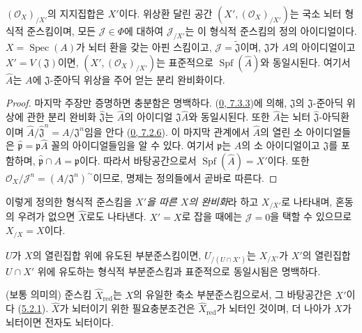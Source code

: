 \begin{proposition}[10.8.5]
\label{I.10.8.5-ko}
$(\mathscr{O}_X)_{/X'}$의 지지집합은 $X'$이다. 위상환 달린 공간
$(X',(\mathscr{O}_X)_{/X'})$는 국소 뇌터 형식적 준스킴이며, 모든
$\mathscr{J}\in\Phi$에 대하여 $\mathscr{J}_{/X'}$는 이 형식적
준스킴의 정의 아이디얼이다. $X=\operatorname{Spec}(A)$가 뇌터 환을
갖는 아핀 스킴이고, $\mathscr{J}=\widetilde{\mathfrak{J}}$이며,
$\mathfrak{J}$가 $A$의 아이디얼이고 $X'=V(\mathfrak{J})$이면,
$(X',(\mathscr{O}_X)_{/X'})$는 표준적으로
$\operatorname{Spf}(\widehat A)$와 동일시된다. 여기서 $\widehat A$는
$A$에 $\mathfrak{J}$-준아딕 위상을 주어 얻는 분리 완비화이다.
\end{proposition}

\begin{proof}
마지막 주장만 증명하면 충분함은 명백하다.
(\hyperref[0.7.3.3-ko]{0, 7.3.3})에 의해, $\mathfrak{J}$의
$\mathfrak{J}$-준아딕 위상에 관한 분리 완비화
$\widehat{\mathfrak{J}}$는 $\widehat A$의 아이디얼
$\mathfrak{J}\widehat A$와 동일시된다. 또한 $\widehat A$는
뇌터 $\widehat{\mathfrak{J}}$-아딕환이며
$\widehat A/\widehat{\mathfrak{J}}^n=A/\mathfrak{J}^n$임을 안다
(\hyperref[0.7.2.6-ko]{0, 7.2.6}). 이 마지막 관계에서
$\widehat A$의 열린 소 아이디얼들은
$\widehat{\mathfrak p}=\mathfrak p\widehat A$ 꼴의 아이디얼들임을 알 수
있다. 여기서 $\mathfrak p$는 $A$의 소 아이디얼이고
$\mathfrak{J}$를 포함하며, $\widehat{\mathfrak p}\cap A=\mathfrak p$이다. 따라서
바탕공간으로서 $\operatorname{Spf}(\widehat A)=X'$이다. 또한
$\mathscr{O}_X/\mathscr{J}^n=(A/\mathfrak{J}^n)^{\sim}$이므로, 명제는
정의들에서 곧바로 따른다.
\end{proof}

이렇게 정의한 형식적 준스킴을 \emph{$X'$을 따른 $X$의 완비화}라 하고
$X_{/X'}$로 나타내며, 혼동의 우려가 없으면 $\widehat X$로도 나타낸다.
$X'=X$로 잡을 때에는 $\mathscr{J}=0$을 택할 수 있으므로
$X_{/X}=X$이다.

$U$가 $X$의 열린집합 위에 유도된 부분준스킴이면,
$U_{/(U\cap X')}$는 $X_{/X'}$가 $X'$의 열린집합 $U\cap X'$ 위에
유도하는 형식적 부분준스킴과 표준적으로 동일시됨은 명백하다.

\begin{corollary}[10.8.6]
\label{I.10.8.6-ko}
(보통 의미의) 준스킴 $\widehat X_{\mathrm{red}}$는 $X$의 유일한 축소
부분준스킴으로서, 그 바탕공간은 $X'$이다
(\hyperref[I.5.2.1-ko]{5.2.1}). $\widehat X$가 뇌터이기 위한
필요충분조건은 $\widehat X_{\mathrm{red}}$가 뇌터인 것이며, 더 나아가
$X$가 뇌터이면 전자도 뇌터이다.
\end{corollary}

